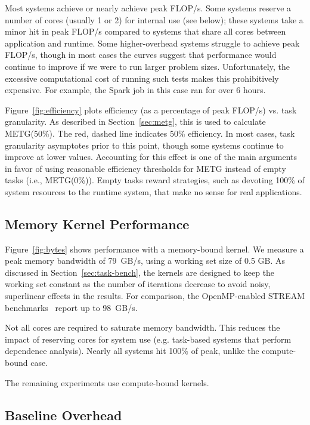 Most systems achieve or nearly achieve peak FLOP/s. Some
systems reserve a number of cores (usually 1 or 2) for internal
use (see below); these systems take a minor hit in peak FLOP/s compared
to systems that share all cores between application and runtime. Some
higher-overhead systems struggle to achieve peak FLOP/s, though in most cases
the curves suggest that performance would continue to improve if we
were to run larger problem sizes. Unfortunately, the excessive
computational cost of running such tests makes this prohibitively
expensive. For example, the Spark job in
this case ran for over 6 hours.

Figure~\ref{fig:efficiency} plots efficiency (as a percentage of
peak FLOP/s) vs. task granularity. As described in Section~\ref{sec:metg}, this is
used to calculate METG(50\%). The
red, dashed line indicates 50\% efficiency.
In most cases, task granularity asymptotes prior to this point,
though some systems continue to improve at lower values. Accounting for this effect is one of the main arguments in
favor of using reasonable efficiency thresholds for METG instead of
empty tasks
(i.e., METG(0\%)). Empty tasks
reward strategies, such as devoting 100\% of
system resources to the runtime system, that make no sense for real
applications.

\subsection{Memory Kernel Performance}

Figure~\ref{fig:bytes} shows performance with a memory-bound kernel. We measure a peak memory
bandwidth of 79~GB/s, using a working set size of 0.5 GB. As discussed in Section~\ref{sec:task-bench}, the kernels are designed to keep the working set constant as the number of iterations decrease to avoid noisy, superlinear effects in the results. For comparison, the
OpenMP-enabled STREAM benchmarks~\cite{STREAM} report up to 98~GB/s.

Not all cores are required to saturate memory bandwidth.
  This reduces the impact of reserving cores for system use
  (e.g. task-based systems that perform dependence analysis). Nearly
all systems hit 100\% of peak, unlike the compute-bound case.

The remaining experiments use compute-bound kernels.


\subsection{Baseline Overhead}

